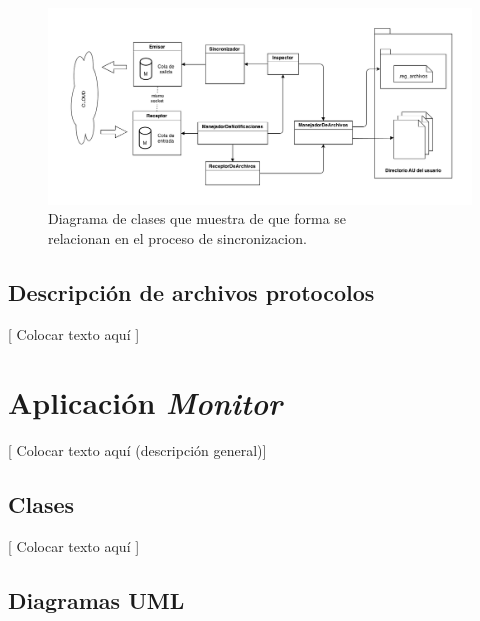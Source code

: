 \documentclass{article}
\begin{document}
\begin{figure}[h]
	\centering
	\includegraphics[width=1.0\textwidth]{images/Diagrama-modelo-cliente.png}
	\caption{Diagrama de clases que muestra de que forma se \\ relacionan en el proceso de sincronizacion.}
\end{figure}
\bigskip



\subsection{Descripción de archivos  protocolos}

	[ Colocar texto aquí ]
\bigskip






\section{Aplicación \textit{Monitor}}

	[ Colocar texto aquí (descripción general)]
\bigskip



\subsection{Clases}

	[ Colocar texto aquí ]
\bigskip



\subsection{Diagramas UML}




\end{document}
